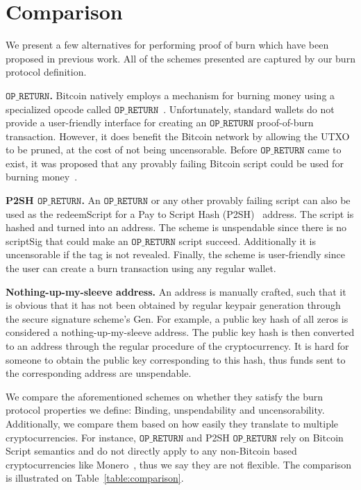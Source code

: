 \section{Comparison}

We present a few alternatives for performing proof of burn which have been proposed in previous work. All of the schemes presented are captured by our burn protocol definition.

\newcommand{\opreturn}{\texttt{OP\_RETURN}}

\noindent
\textbf{$\opreturn$.}
Bitcoin natively employs a mechanism for burning money using a specialized
opcode called $\opreturn$~\cite{bartoletti2017analysis}. Unfortunately,
standard wallets do not provide a user-friendly interface for creating an $\opreturn$ proof-of-burn transaction.
However, it does benefit the Bitcoin network by allowing the UTXO
to be pruned, at the cost of not being uncensorable.
Before $\opreturn$ came to exist, it was proposed that any provably failing Bitcoin script could be used for burning money~\cite{stewart}.

\noindent
\textbf{P2SH $\opreturn$.}
An $\opreturn$ or any other provably failing script can also be used as the redeemScript for a Pay to Script Hash (P2SH)~\cite{p2sh} address. The script is hashed and turned into an address. The scheme is unspendable since there is no scriptSig that could make an $\opreturn$ script succeed. Additionally it is uncensorable if the tag is not revealed. Finally, the scheme is user-friendly since the user can create a burn transaction using any regular wallet.

\noindent
\textbf{Nothing-up-my-sleeve address.}
An address is manually crafted, such that it is obvious that it has not been obtained by regular keypair generation through the secure signature scheme's \textsf{Gen}. For example, a public key hash of all zeros is considered a nothing-up-my-sleeve address. The public key hash is then converted to an address through the regular procedure of the cryptocurrency. It is hard for someone to obtain the public key corresponding to this hash, thus funds sent to the corresponding address are unspendable.

We compare the aforementioned schemes on whether they satisfy the burn protocol properties we define: Binding, unspendability and uncensorability. Additionally, we compare them based on how easily they translate to multiple cryptocurrencies. For instance, $\opreturn$ and P2SH $\opreturn$ rely on Bitcoin Script semantics and do not directly apply to any non-Bitcoin based cryptocurrencies like Monero~\cite{van2013cryptonote}, thus we say they are not flexible. The comparison is illustrated on Table~\ref{table:comparison}.

